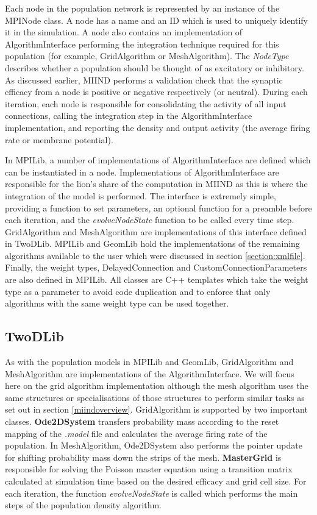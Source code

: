 \documentclass[utf8]{frontiersSCNS} %
\begin{document}
Each node in the population network is represented by an instance of the MPINode class. A node has a name and an ID which is used to uniquely identify it in the simulation. A node also contains an implementation of AlgorithmInterface performing the integration technique required for this population (for example, GridAlgorithm or MeshAlgorithm). The \textit{NodeType} describes whether a population should be thought of as excitatory or inhibitory. As discussed earlier, MIIND performs a validation check that the synaptic efficacy from a node is positive or negative respectively (or neutral). During each iteration, each node is responsible for consolidating the activity of all input connections, calling the integration step in the AlgorithmInterface implementation, and reporting the density and output activity (the average firing rate or membrane potential).

In MPILib, a number of implementations of AlgorithmInterface are defined which can be instantiated in a node. Implementations of AlgorithmInterface are responsible for the lion's share of the computation in MIIND as this is where the integration of the model is performed. The interface is extremely simple, providing a function to set parameters, an optional function for a preamble before each iteration, and the \textit{evolveNodeState} function to be called every time step. GridAlgorithm and MeshAlgorithm are implementations of this interface defined in TwoDLib. MPILib and GeomLib hold the implementations of the remaining algorithms available to the user which were discussed in section \ref{section:xmlfile}. Finally, the weight types, DelayedConnection and CustomConnectionParameters are also defined in MPILib. All classes are C++ templates which take the weight type as a parameter to avoid code duplication and to enforce that only algorithms with the same weight type can be used together.

\subsection{TwoDLib}
As with the population models in MPILib and GeomLib, GridAlgorithm and MeshAlgorithm are implementations of the AlgorithmInterface. We will focus here on the grid algorithm implementation although the mesh algorithm uses the same structures or specialisations of those structures to perform similar tasks as set out in section \ref{miindoverview}. GridAlgorithm is supported by two important classes. \textbf{Ode2DSystem} transfers probability mass according to the reset mapping of the \textit{.model} file and calculates the average firing rate of the population. In MeshAlgorithm, Ode2DSystem also performs the pointer update for shifting probability mass down the strips of the mesh. \textbf{MasterGrid} is responsible for solving the Poisson master equation using a transition matrix calculated at simulation time based on the desired efficacy and grid cell size. For each iteration, the function \textit{evolveNodeState} is called which performs the main steps of the population density algorithm. 
\end{document}
